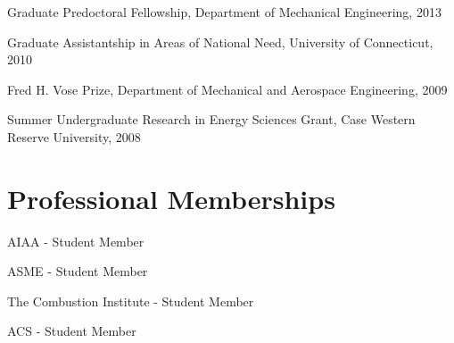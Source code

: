 Graduate Predoctoral Fellowship, Department of Mechanical
Engineering, 2013

Graduate Assistantship in Areas of National
Need, University of Connecticut, 2010

Fred H. Vose Prize, Department of Mechanical and
Aerospace Engineering, 2009

Summer Undergraduate Research in Energy Sciences
Grant, Case Western Reserve University, 2008

\section{{\sectionfont Professional Memberships}}
AIAA - Student Member

ASME - Student Member

The Combustion Institute - Student Member

ACS - Student Member



